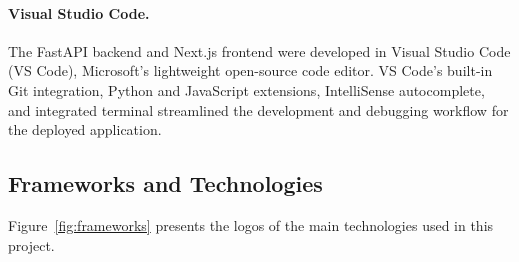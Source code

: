\paragraph{Visual Studio Code.}
The FastAPI backend and Next.js frontend were developed in Visual Studio Code (VS Code), Microsoft's lightweight open-source code editor. VS Code's built-in Git integration, Python and JavaScript extensions, IntelliSense autocomplete, and integrated terminal streamlined the development and debugging workflow for the deployed application.

\subsection{Frameworks and Technologies}

Figure~\ref{fig:frameworks} presents the logos of the main technologies used in this project.

